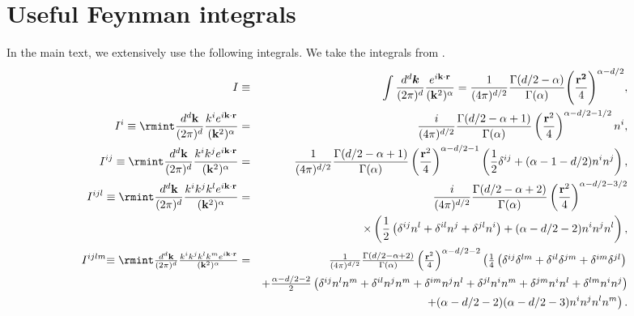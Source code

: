 \section{Useful Feynman integrals} \label{ch3:app:A}
In the main text, we extensively use the following integrals. %
 We take the integrals from \cite{Levi:2011eq}.
\begingroup
\small
\begin{eqnarray}
\label{ch3:tensorfourierindentity}
\hspace{0cm}I&\equiv& \int \frac{d^d \boldsymbol{k}}{(2\pi)^d}\frac{e^{i\bf{k}\cdot\bf{r}}}{({\bf{k}}^2)^\alpha}=\frac{1}{(4\pi)^{d/2}}\frac{\Gamma(d/2-\alpha)}{\Gamma(\alpha)}\Bigg(\frac{\bf{r}^2}{4}\Bigg)^{\alpha-d/2}, \label{int1}\\ 
I^i\equiv\rmint\frac{d^d\bf{k}}{(2\pi)^d}\frac{k^ie^{i\bf{k}\cdot\bf{r}}}{({\bf{k}}^2)^\alpha}&=&\frac{i}{(4\pi)^{d/2}}\frac{\Gamma(d/2-\alpha+1)}{\Gamma(\alpha)}\left(\frac{{\bf{r}}^2}{4}\right)^{\alpha-d/2-1/2}n^i, \label{int}\\
I^{ij}\equiv\rmint\frac{d^d\bf{k}}{(2\pi)^d}\frac{k^ik^je^{i\bf{k}\cdot\bf{r}}}{({\bf{k}}^2)^\alpha}&=&\frac{1}{(4\pi)^{d/2}}\frac{\Gamma(d/2-\alpha+1)}{\Gamma(\alpha)}\left(\frac{{\bf{r}}^2}{4}\right)^{\alpha-d/2-1}\left(\frac{1}{2}\delta^{ij}+(\alpha-1-d/2)n^in^j\right),\\
I^{ijl}\equiv\rmint\frac{d^d\bf{k}}{(2\pi)^d}\frac{k^ik^jk^le^{i\bf{k}\cdot\bf{r}}}{({\bf{k}}^2)^\alpha}&=&\frac{i}{(4\pi)^{d/2}}\frac{\Gamma(d/2-\alpha+2)}{\Gamma(\alpha)}\left(\frac{{\bf{r}}^2}{4}\right)^{\alpha-d/2-3/2}\nonumber\\
&&\quad
\times\left(\frac{1}{2}\left(\delta^{ij}n^l+\delta^{il}n^j+\delta^{jl}n^i\right)+(\alpha-d/2-2)n^in^jn^l\right),\\
I^{ijlm}\textstyle{\equiv\rmint\frac{d^d\bf{k}}{(2\pi)^d}\frac{k^ik^jk^lk^me^{i\bf{k}\cdot\bf{r}}}{({\bf{k}}^2)^\alpha}}&=&\textstyle{\frac{1}{(4\pi)^{d/2}}\frac{\Gamma(d/2-\alpha+2)}{\Gamma(\alpha)}\left(\frac{{\bf{r}}^2}{4}\right)^{\alpha-d/2-2}\left(\frac{1}{4}\left(\delta^{ij}\delta^{lm}+\delta^{il}\delta^{jm}+\delta^{im}\delta^{jl}\right)\right.} \\
&&
\textstyle{+\frac{\alpha-d/2-2}{2}\left(\delta^{ij}n^ln^m+\delta^{il}n^jn^m+\delta^{im}n^jn^l+\delta^{jl}n^in^m+\delta^{jm}n^in^l+\delta^{lm}n^in^j\right) }\nonumber\\
&&\left.\quad
+(\alpha-d/2-2)(\alpha-d/2-3)n^in^jn^ln^m\right).\nonumber
\end{eqnarray}
